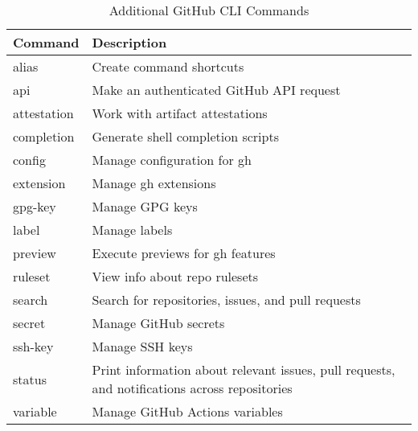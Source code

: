 \documentclass[openany, 12pt]{book}
\begin{document}
\begin{table}[h]
	\centering
	\begin{tabular}{ll}
		\toprule
		\textbf{Command} & \textbf{Description}                                                                          \\
		\midrule
		alias            & Create command shortcuts                                                                      \\
		api              & Make an authenticated GitHub API request                                                      \\
		attestation      & Work with artifact attestations                                                               \\
		completion       & Generate shell completion scripts                                                             \\
		config           & Manage configuration for gh                                                                   \\
		extension        & Manage gh extensions                                                                          \\
		gpg-key          & Manage GPG keys                                                                               \\
		label            & Manage labels                                                                                 \\
		preview          & Execute previews for gh features                                                              \\
		ruleset          & View info about repo rulesets                                                                 \\
		search           & Search for repositories, issues, and pull requests                                            \\
		secret           & Manage GitHub secrets                                                                         \\
		ssh-key          & Manage SSH keys                                                                               \\
		status           & Print information about relevant issues, pull requests, and notifications across repositories \\
		variable         & Manage GitHub Actions variables                                                               \\
		\bottomrule
	\end{tabular}
	\caption{Additional GitHub CLI Commands}
\end{table}
\end{document}
